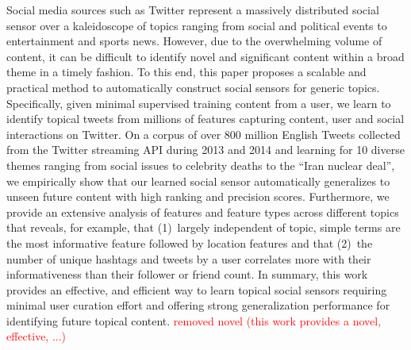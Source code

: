 
Social media sources such as Twitter represent a massively distributed
social sensor over a kaleidoscope of topics ranging from social and
political events to entertainment and sports news.
However, due to the overwhelming volume of content, it can be
difficult to identify novel and significant content within a broad
theme in a timely fashion.
%
%
To this end, this paper proposes a scalable and practical method to
automatically construct social sensors for generic topics.
Specifically, given minimal supervised training content from a user, we learn 
to identify topical tweets 
from millions of features capturing content, user and social interactions on Twitter.
On a corpus of over 800 million English Tweets
collected from the Twitter
streaming API during 2013 and 2014 and learning for 10 diverse themes 
ranging from social issues to celebrity deaths to the ``Iran nuclear
deal'', we empirically show that our learned social sensor
automatically generalizes to unseen future content 
with high ranking and precision scores.  Furthermore, we provide an
extensive analysis of features and feature types across different
topics that reveals, for example, that (1)~largely independent of
topic, simple terms are the most informative feature followed by
location features and that (2)~the number of unique hashtags and
tweets by a user correlates more with their informativeness than their
follower or friend count.  In summary, this work provides an effective, and efficient way to learn topical social sensors requiring
minimal user curation effort and offering strong generalization performance
for identifying future topical content.
\textcolor{red}{removed novel (this work provides a novel, effective, ...)}

